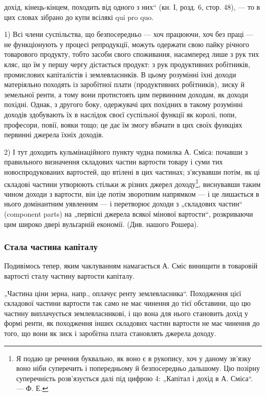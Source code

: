\parcont{}  %
дохід, кінець-кінцем, походить від одного з них“ (кн. І, розд. 6,
стор. 48), — то в цих словах зібрано до купи всілякі qui pro quo.

1) Всі члени суспільства, що безпосередньо — хоч працюючи, хоч
без праці — не функціонують у процесі репродукції, можуть одержати
свою пайку річного товарового продукту, тобто засоби свого споживання,
насамперед лише з рук тих кляс, що їм у першу чергу дістається
продукт: з рук продуктивних робітників, промислових капіталістів і
землевласників. В цьому розумінні їхні доходи матеріяльно походять із
заробітної плати (продуктивних робітників), зиску й земельної ренти, а
тому вони протистоять цим первинним доходам, як доходи похідні.
Однак, з другого боку, одержувачі цих похідних в такому розумінні доходів
здобувають їх в наслідок своєї суспільної функції як королі,
попи, професори, повії, вояки тощо; це дає їм змогу вбачати в цих
своїх функціях первинні джерела їхніх доходів.

2) І тут доходить кульмінаційного пункту чудна помилка А. Сміса:
почавши з правильного визначення складових частин вартости товару і
суми тих новоспродукованих вартостей, що втілені в цих частинах; з’ясувавши
потім, як ці складові частини утворюють стільки ж різних
джерел доходу\footnote{
Я подаю це речення буквально, як воно є в рукопису, хоч у даному зв’язку
воно ніби суперечить і попередньому й безпосередньо дальшому. Цю позірну
суперечність розв’язується далі під цифрою 4: „Капітал і дохід в А. Сміса“. — Ф. Е.
}, виснувавши таким чином доходи з вартости, він іде
потім зворотним напрямком — і це лишається в нього домінантним уявленням
— і перетворює доходи з „складових частин“ (component parts)
на „первісні джерела всякої мінової вартости“, розкриваючи цим
широко двері вульґарній економії. (Див. нашого Рошера).

\subsubsection{Стала частина капіталу}

Подивімось тепер, яким чаклуванням намагається А. Сміс винищити
в товаровій вартості сталу частину вартости капіталу.

„Частина ціни зерна, напр., оплачує ренту землевласника“. Походження
цієї складової частини вартости так само не має чинення до тієї
обставини, що цю частину виплачується землевласникові, і що вона для
нього становить дохід у формі ренти, як походження інших складових
частин вартости не має чинення до того, що вони як зиск і заробітна
плата становлять джерела доходу.

